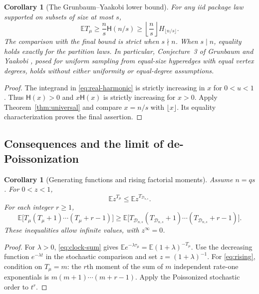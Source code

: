 \documentclass[11pt]{article}
\numberwithin{equation}{section}
\newtheorem{corollary}[theorem]{Corollary}
\theoremstyle{remark}
\newcommand{\E}{\mathbb E}
\newcommand{\1}{\mathbf 1}
\newcommand{\D}{\mathcal D}
\newcommand{\hreal}{\mathsf H}
\begin{document}
\begin{corollary}[The Grunbaum--Yaakobi lower bound]\label{cor:GY}
For any iid package law supported on subsets of size at most $s$,
\begin{equation}\label{eq:floor-bound}
 \E T_\mu\geq \frac ns\hreal(n/s)
 \geq \left\lfloor\frac ns\right\rfloor H_{\lfloor n/s\rfloor}.
\end{equation}
The comparison with the final bound is strict when $s\nmid n$. When $s\mid n$, equality holds exactly for the partition laws. In particular, Conjecture~3 of Grunbaum and Yaakobi \cite{GrunbaumYaakobi}, posed for uniform sampling from equal-size hyperedges with equal vertex degrees, holds without either uniformity or equal-degree assumptions.
\end{corollary}

\begin{proof}
The integrand in \eqref{eq:real-harmonic} is strictly increasing in $x$ for $0<u<1$. Thus $\hreal(x)>0$ and $x\hreal(x)$ is strictly increasing for $x>0$. Apply Theorem~\ref{thm:universal} and compare $x=n/s$ with $\lfloor x\rfloor$. Its equality characterization proves the final assertion.
\end{proof}

\subsection{Consequences and the limit of de-Poissonization}

\begin{corollary}[Generating functions and rising factorial moments]\label{cor:transforms}
Assume $n=qs$. For $0<z<1$,
\begin{equation}\label{eq:pgf}
 \E z^{T_\mu}\leq\E z^{T_{\D_{n,s}}}.
\end{equation}
For each integer $r\geq1$,
\begin{equation}\label{eq:rising}
 \E\bigl[T_\mu(T_\mu+1)\cdots(T_\mu+r-1)\bigr]
 \geq
 \E\bigl[T_{\D_{n,s}}(T_{\D_{n,s}}+1)\cdots
              (T_{\D_{n,s}}+r-1)\bigr].
\end{equation}
These inequalities allow infinite values, with $z^\infty=0$.
\end{corollary}

\begin{proof}
For $\lambda>0$, \eqref{eq:clock-sum} gives
$\E e^{-\lambda\tau_\mu}=\E(1+\lambda)^{-T_\mu}$.
Use the decreasing function $e^{-\lambda t}$ in the stochastic comparison and set $z=(1+\lambda)^{-1}$. For \eqref{eq:rising}, condition on $T_\mu=m$: the $r$th moment of the sum of $m$ independent rate-one exponentials is $m(m+1)\cdots(m+r-1)$. Apply the Poissonized stochastic order to $t^r$.
\end{proof}
\end{document}
